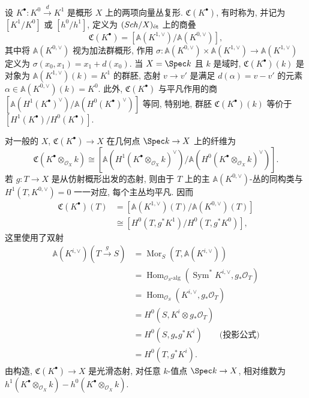 \begin{example}[向量丛叠]\label{src:4.9.33}
设 $K^\bullet:K^0\xrightarrow{d}K^1$ 是概形 $X$ 上的两项向量丛复形.  $\mathfrak C(K^\bullet)$, 有时称为, 并记为 $[K^1/K^0]$ 或 $[h^0/h^1]$, 定义为 $(Sch/X)_{\text{ét}}$ 上的商叠
\[
\mathfrak C(K^\bullet)=[\mathbb A(K^{1,\vee})/\mathbb A(K^{0,\vee})],
\]
其中将 $\mathbb A(K^{0,\vee})$ 视为加法群概形, 作用 $\sigma:\mathbb A(K^{0,\vee})\times\mathbb A(K^{1,\vee})\to\mathbb A(K^{1,\vee})$ 定义为 $\sigma(x_0,x_1)=x_1+d(x_0)$. 当 $X=\Spec k$ 且 $k$ 是域时, $\mathfrak C(K^\bullet)(k)$ 是对象为 $\mathbb A(K^{1,\vee})(k)=K^1$ 的群胚, 态射 $v\to v'$ 是满足 $d(\alpha)=v-v'$ 的元素 $\alpha\in\mathbb A(K^{0,\vee})(k)=K^0$. 此外, $\mathfrak C(K^\bullet)$ 与平凡作用的商 $[\mathbb A(H^1(K^\bullet)^\vee)/\mathbb A(H^0(K^\bullet)^\vee)]$ 等同, 特别地, 群胚 $\mathfrak C(K^\bullet)(k)$ 等价于 $[H^1(K^\bullet)/H^0(K^\bullet)]$.

对一般的 $X$, $\mathfrak C(K^\bullet)\to X$ 在几何点 $\Spec k\to X$ 上的纤维为
\[
\mathfrak C(K^\bullet\otimes_{\mathcal O_X}k)\cong
[\mathbb A(H^1(K^\bullet\otimes_{\mathcal O_X}k)^\vee)/
\mathbb A(H^0(K^\bullet\otimes_{\mathcal O_X}k)^\vee)].
\]
若 $g:T\to X$ 是从仿射概形出发的态射, 则由于 $T$ 上的主 $\mathbb A(K^{0,\vee})$-丛的同构类与 $H^1(T,K^{0,\vee})=0$ 一一对应, 每个主丛均平凡. 因而
\[
\begin{aligned}
\mathfrak C(K^\bullet)(T)
&=[\mathbb A(K^{1,\vee})(T)/\mathbb A(K^{0,\vee})(T)]\\
&\cong[H^0(T,g^*K^1)/H^0(T,g^*K^0)],
\end{aligned}
\]
这里使用了双射
\begin{equation}\label{src:4.9.34}
\begin{aligned}
\mathbb A(K^{i,\vee})(T\xrightarrow{g}S)
&=\operatorname{Mor}_S(T,\mathbb A(K^{i,\vee}))\\
&=\operatorname{Hom}_{\mathcal O_S\text{-}\mathrm{alg}}
(\operatorname{Sym}^*K^{i,\vee},g_*\mathcal O_T)\\
&=\operatorname{Hom}_{\mathcal O_S}(K^{i,\vee},g_*\mathcal O_T)\\
&=H^0(S,K^i\otimes g_*\mathcal O_T)\\
&=H^0(S,g_*g^*K^i)\qquad\text{(投影公式)}\\
&=H^0(T,g^*K^i).
\end{aligned}
\end{equation}
由构造, $\mathfrak C(K^\bullet)\to X$ 是光滑态射, 对任意 $k$-值点 $\Spec k\to X$, 相对维数为 $h^1(K^\bullet\otimes_{\mathcal O_X}k)-h^0(K^\bullet\otimes_{\mathcal O_X}k)$.
\end{example}
